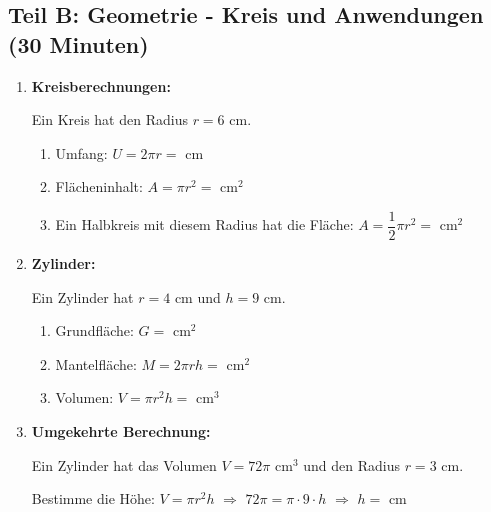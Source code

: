 \subsection*{Teil B: Geometrie - Kreis und Anwendungen (30 Minuten)}

\begin{enumerate}[label=\arabic*., resume]

    \item \textbf{Kreisberechnungen:}
    \vspace{0.5cm}

    Ein Kreis hat den Radius $r = 6$ cm.

        \begin{enumerate}[label=\alph*)]
        \item Umfang: $U = 2\pi r =$ \underline{\hspace{2cm}} cm
        \vspace{0.3cm}
        \item Flächeninhalt: $A = \pi r^2 =$ \underline{\hspace{2cm}} cm$^2$
        \vspace{0.3cm}
        \item Ein Halbkreis mit diesem Radius hat die Fläche: $A = \dfrac{1}{2}\pi r^2 =$ \underline{\hspace{2cm}} cm$^2$
    \end{enumerate}

    \vspace{1cm}

    \item \textbf{Zylinder:}
    \vspace{0.5cm}

    Ein Zylinder hat $r = 4$ cm und $h = 9$ cm.

    \begin{enumerate}[label=\alph*)]
        \item Grundfläche: $G =$ \underline{\hspace{2cm}} cm$^2$
        \vspace{0.3cm}
        \item Mantelfläche: $M = 2\pi rh =$ \underline{\hspace{2cm}} cm$^2$
        \vspace{0.3cm}
        \item Volumen: $V = \pi r^2 h =$ \underline{\hspace{2cm}} cm$^3$
    \end{enumerate}

    \vspace{1cm}

    \item \textbf{Umgekehrte Berechnung:}
    \vspace{0.5cm}

    Ein Zylinder hat das Volumen $V = 72\pi$ cm$^3$ und den Radius $r = 3$ cm.

    Bestimme die Höhe: $V = \pi r^2 h$ $\Rightarrow$ $72\pi = \pi \cdot 9 \cdot h$ $\Rightarrow$ $h =$ \underline{\hspace{2cm}} cm

\end{enumerate}
